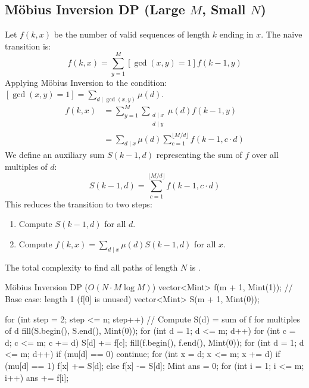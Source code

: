 \documentclass[11pt]{article}
\newcommand{\complexity}[1]{%
  \tcbox[on line, 
    colback=complbg, 
    colframe=compltext!50, 
    boxrule=0.5pt, 
    arc=2pt, 
    boxsep=0pt, 
    left=3pt, right=3pt, top=2pt, bottom=2pt
  ]{\color{compltext}\small\ensuremath{#1}}%
}
\begin{document}
\subsection{Möbius Inversion DP (Large \texorpdfstring{$M$}{M}, Small \texorpdfstring{$N$}{N})}

\begin{derivation}
    Let $f(k, x)$ be the number of valid sequences of length $k$ ending in $x$.
    The naive transition is:
    \[ f(k, x) = \sum_{y=1}^M [\gcd(x, y) = 1] f(k-1, y) \]
    Applying Möbius Inversion to the condition: $[\gcd(x, y) = 1] = \sum_{d \mid \gcd(x, y)} \mu(d)$.
    \begin{align*}
        f(k, x) & = \sum_{y=1}^M \sum_{\substack{d \mid x \\ d \mid y}} \mu(d) f(k-1, y)      \\
                & = \sum_{d \mid x} \mu(d) \sum_{c=1}^{\lfloor M/d \rfloor} f(k-1, c \cdot d)
    \end{align*}
    We define an auxiliary sum $S(k-1, d)$ representing the sum of $f$ over all multiples of $d$:
    \[ S(k-1, d) = \sum_{c=1}^{\lfloor M/d \rfloor} f(k-1, c \cdot d) \]
    This reduces the transition to two \complexity{O(M \log M)} steps:
    \begin{enumerate}
        \item Compute $S(k-1, d)$ for all $d$.
        \item Compute $f(k, x) = \sum_{d \mid x} \mu(d) S(k-1, d)$ for all $x$.
    \end{enumerate}
    The total complexity to find all paths of length $N$ is \complexity{O(N \cdot M \log M)}.
\end{derivation}

\begin{vscode}{Möbius Inversion DP ($O(N \cdot M \log M)$)}
vector<Mint> f(m + 1, Mint(1)); // Base case: length 1 (f[0] is unused)
vector<Mint> S(m + 1, Mint(0));

for (int step = 2; step <= n; step++)
{
    // Compute S(d) = sum of f for multiples of d
    fill(S.begin(), S.end(), Mint(0));
    for (int d = 1; d <= m; d++)
    {
        for (int c = d; c <= m; c += d)
            S[d] += f[c];
    }
    fill(f.begin(), f.end(), Mint(0));
    for (int d = 1; d <= m; d++)
    {
        if (mu[d] == 0) continue;
        for (int x = d; x <= m; x += d)
        {
            if (mu[d] == 1) f[x] += S[d];
            else f[x] -= S[d];
        }
    }
}
Mint ans = 0;
for (int i = 1; i <= m; i++) ans += f[i];
\end{vscode}
\end{document}

